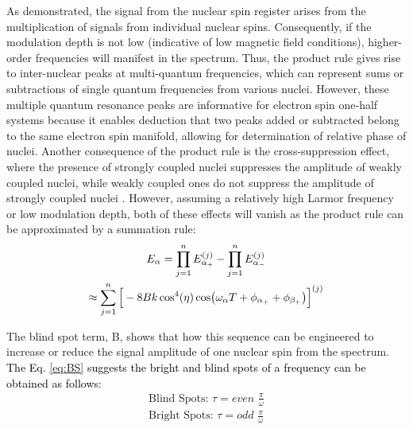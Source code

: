 \documentclass[%
 reprint,
superscriptaddress,
 amsmath,amssymb,
 aps,
]{revtex4-2}
\begin{document}
As demonstrated, the signal from the nuclear spin register arises from the multiplication of signals from individual nuclear spins.
Consequently, if the modulation depth is not low (indicative of low magnetic field conditions), higher-order frequencies will manifest in the spectrum.
Thus, the product rule gives rise to inter-nuclear peaks at multi-quantum frequencies, which can represent sums or subtractions of single quantum frequencies from various nuclei.
However, these multiple quantum resonance peaks are informative for electron spin one-half systems because it enables deduction that two peaks added or subtracted belong to the same electron spin manifold, allowing for determination of relative phase of nuclei.
Another consequence of the product rule is the cross-suppression effect, where the presence of strongly coupled nuclei suppresses the amplitude of weakly coupled nuclei, while weakly coupled ones do not suppress the amplitude of strongly coupled nuclei \cite{stoll2005peak}. However, assuming a relatively high Larmor frequency or low modulation depth, both of these effects will vanish as the product rule can be approximated by a summation rule:\\
\begin{gather}
	E_\alpha = \prod_{j=1}^n E_{\alpha_+}^{(j)} - \prod_{j=1}^n E_{\alpha_-}^{(j)}  \notag \\ 
	\approx \sum_{j=1}^n \Big[-8Bk\cos^4(\eta) \cos(\omega_\alpha T + \phi_{\alpha_+}+ \phi_{\beta_+}) \Big]^{(j)}
\end{gather}

The blind spot term, B, shows that how this sequence can be engineered to increase or reduce the signal amplitude of one nuclear spin from the spectrum. 
\textcolor{black}{The Eq. \ref{eq:BS} suggests the bright and blind spots of a frequency can be obtained as follows}:
\begin{align}
	\text{Blind Spots:	} \tau = even \,\, \frac{\pi}{\omega}\\
	\text{Bright Spots:	} \tau = odd \,\, \frac{\pi}{\omega}
\end{align}
\end{document}
